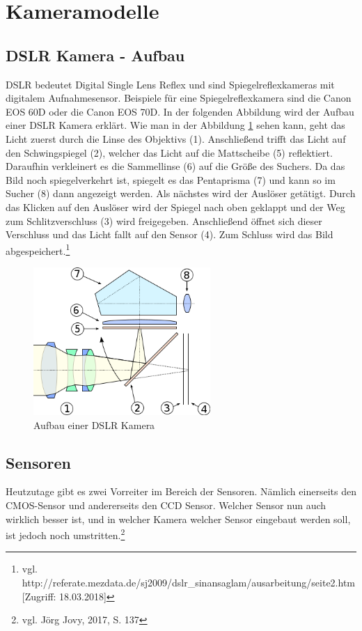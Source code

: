 \section{Kameramodelle}
\subsection{DSLR Kamera - Aufbau}
DSLR bedeutet Digital Single Lens Reflex und sind Spiegelreflexkameras mit digitalem Aufnahmesensor. Beispiele für eine Spiegelreflexkamera sind die Canon EOS 60D oder die Canon EOS 70D. In der folgenden Abbildung wird der Aufbau einer DSLR Kamera erklärt.\newline 
Wie man in der Abbildung \ref{fig:abb13} sehen kann, geht das Licht zuerst durch die Linse des Objektivs (1). Anschließend trifft das Licht auf den Schwingspiegel (2), welcher das Licht auf die Mattscheibe (5) reflektiert. Daraufhin verkleinert es die Sammellinse (6) auf die Größe des Suchers. Da das Bild noch spiegelverkehrt ist, spiegelt es das Pentaprisma (7) und kann so im Sucher (8) dann angezeigt werden. Als nächstes wird der Auslöser getätigt. Durch das Klicken auf den Auslöser wird der Spiegel nach oben geklappt und der Weg zum Schlitzverschluss (3) wird freigegeben. Anschließend öffnet sich dieser Verschluss und das Licht fallt auf den Sensor (4). Zum Schluss wird das Bild abgespeichert.\footnote{vgl. http://referate.mezdata.de/sj2009/dslr\_sinan\-saglam/ausarbeitung/seite2.htm [Zugriff: 18.03.2018]}
\begin{figure}[H]
	\centering
	\includegraphics[width=0.6\textwidth]{abb13} 
	\caption[Aufbau einer DSLR Kamera]{Aufbau einer DSLR Kamera\footnotemark}\label{fig:abb13}
\end{figure}
\subsection{Sensoren}
Heutzutage gibt es zwei Vorreiter im Bereich der Sensoren. Nämlich einerseits den CMOS-Sensor und andererseits den CCD Sensor. Welcher Sensor nun auch wirklich besser ist, und in welcher Kamera welcher Sensor eingebaut werden soll, ist jedoch noch umstritten.\footnote{\label{}vgl. Jörg Jovy, 2017, S. 137}
